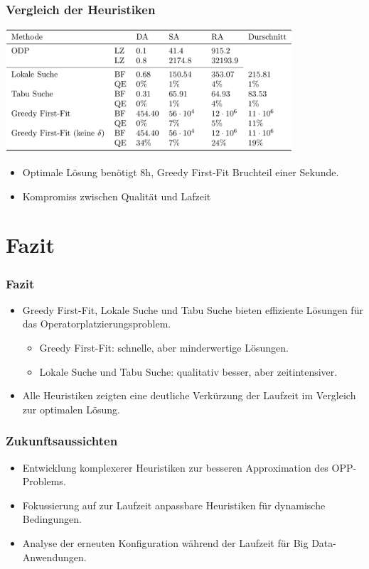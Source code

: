 \documentclass{beamer}
\begin{document}
\begin{frame}
\frametitle{Vergleich der Heuristiken}
\begin{center}
    \includegraphics[width=0.8\textwidth]{res/evaluation.png} 
\end{center}
\begin{itemize}
    \item Optimale Lösung benötigt 8h, Greedy First-Fit Bruchteil einer Sekunde.
    \item Kompromiss zwischen Qualität und Lafzeit

\end{itemize}
\end{frame}

\section{Fazit}
\begin{frame}
\frametitle{Fazit}
\begin{itemize}
    \item Greedy First-Fit, Lokale Suche und Tabu Suche bieten effiziente Lösungen für das Operatorplatzierungsproblem.
    \begin{itemize}
        \item Greedy First-Fit: schnelle, aber minderwertige Lösungen.
        \item Lokale Suche und Tabu Suche: qualitativ besser, aber zeitintensiver.
    \end{itemize}
    \item Alle Heuristiken zeigten eine deutliche Verkürzung der Laufzeit im Vergleich zur optimalen Lösung.
\end{itemize}
\end{frame}

\begin{frame}
\frametitle{Zukunftsaussichten}
\begin{itemize}
    \item Entwicklung komplexerer Heuristiken zur besseren Approximation des OPP-Problems.
    \item Fokussierung auf zur Laufzeit anpassbare Heuristiken für dynamische Bedingungen.
    \item Analyse der erneuten Konfiguration während der Laufzeit für Big Data-Anwendungen.
\end{itemize}
\end{frame}
\end{document}
